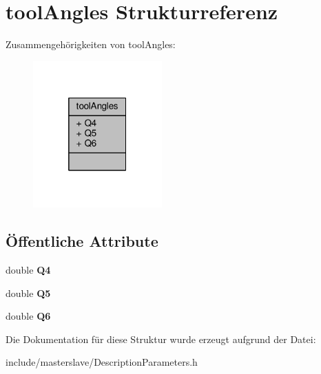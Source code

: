 \hypertarget{structtoolAngles}{\section{tool\-Angles Strukturreferenz}
\label{structtoolAngles}
}


Zusammengehörigkeiten von tool\-Angles\-:
\nopagebreak
\begin{figure}[H]
\begin{center}
\leavevmode
\includegraphics[width=140pt]{structtoolAngles__coll__graph}
\end{center}
\end{figure}
\subsection*{Öffentliche Attribute}
\begin{DoxyCompactItemize}
\item 
\hypertarget{structtoolAngles_a69ef685141e5c2d4e281c968328edb71}{double {\bfseries Q4}}\label{structtoolAngles_a69ef685141e5c2d4e281c968328edb71}

\item 
\hypertarget{structtoolAngles_acb61a7170bab38724e8c3cd75b7c7f3a}{double {\bfseries Q5}}\label{structtoolAngles_acb61a7170bab38724e8c3cd75b7c7f3a}

\item 
\hypertarget{structtoolAngles_a9075e6ee17f6548fdf073e366ec7a986}{double {\bfseries Q6}}\label{structtoolAngles_a9075e6ee17f6548fdf073e366ec7a986}

\end{DoxyCompactItemize}


Die Dokumentation für diese Struktur wurde erzeugt aufgrund der Datei\-:\begin{DoxyCompactItemize}
\item 
include/masterslave/Description\-Parameters.\-h\end{DoxyCompactItemize}
